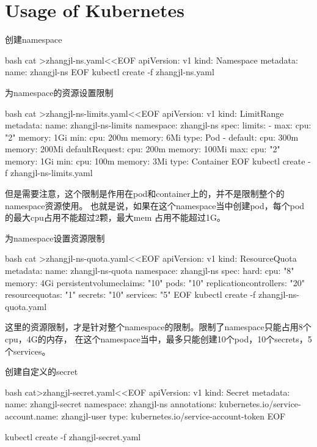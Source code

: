 \section{Usage of Kubernetes}
\begin{outline}[enumerate]
\1 创建namespace
\begin{code-in-enumerate}{bash}
cat >zhangjl-ns.yaml<<EOF
apiVersion: v1
kind: Namespace
metadata:
  name: zhangjl-ns
EOF
kubectl create -f zhangjl-ns.yaml
\end{code-in-enumerate}

\1 为namespace的资源设置限制
\begin{code-in-enumerate}{bash}
cat >zhangjl-ns-limits.yaml<<EOF
apiVersion: v1
kind: LimitRange
metadata:
  name: zhangjl-ns-limits
  namespace: zhangjl-ns
spec:
  limits:
  - max:
      cpu: "2"
      memory: 1Gi
    min:
      cpu: 200m
      memory: 6Mi
    type: Pod
  - default:
      cpu: 300m
      memory: 200Mi
    defaultRequest:
      cpu: 200m
      memory: 100Mi
    max:
      cpu: "2"
      memory: 1Gi
    min:
      cpu: 100m
      memory: 3Mi
    type: Container
EOF
kubectl create -f zhangjl-ns-limits.yaml
\end{code-in-enumerate}
但是需要注意，这个限制是作用在pod和container上的，并不是限制整个的namespace资源使用。
也就是说，如果在这个namespace当中创建pod，每个pod的最大cpu占用不能超过2颗，最大mem
占用不能超过1G。

\1 为namespace设置资源限制
\begin{code-in-enumerate}{bash}
cat >zhangjl-ns-quota.yaml<<EOF
apiVersion: v1
kind: ResourceQuota
metadata:
  name: zhangjl-ns-quota
  namespace: zhangjl-ns
spec:
  hard:
    cpu: "8"
    memory: 4Gi
    persistentvolumeclaims: "10"
    pods: "10"
    replicationcontrollers: "20"
    resourcequotas: "1"
    secrets: "10"
    services: "5"
EOF
kubectl create -f zhangjl-ns-quota.yaml
\end{code-in-enumerate}
这里的资源限制，才是针对整个namespace的限制。限制了namespace只能占用8个cpu，4G的内存，
在这个namespace当中，最多只能创建10个pod，10个secrets，5个services。

\1 创建自定义的secret
\begin{code-in-enumerate}{bash}
cat>zhangjl-secret.yaml<<EOF
apiVersion: v1
kind: Secret
metadata:
  name: zhangjl-secret
  namespace: zhangjl-ns
  annotations:
    kubernetes.io/service-account.name: zhangjl-user
type: kubernetes.io/service-account-token
EOF

kubectl create -f zhangjl-secret.yaml
\end{code-in-enumerate}


\end{outline}
